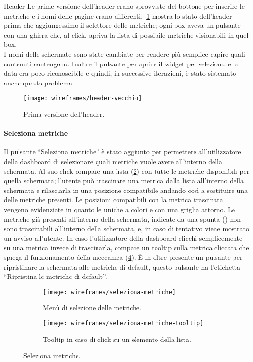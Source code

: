 \begin{bclogo}{Header}
Le prime versione dell'header erano sprovviste del bottone per inserire le metriche e i nomi delle pagine erano differenti.~\ref{fig:header-vecchio} mostra lo stato dell'header prima che aggiungessimo il selettore delle metriche; ogni box aveva un pulsante con una ghiera che, al click, apriva la lista di possibile metriche visionabili in quel box.\\
I nomi delle schermate sono state cambiate per rendere più semplice capire quali contenuti contengono.
Inoltre il pulsante per aprire il widget per selezionare la data era poco riconoscibile e quindi, in successive iterazioni, è stato sistemato anche questo problema.
\begin{figure}[H]
    \centering
    \texttt{[image: wireframes/header-vecchio]}
    \caption{Prima versione dell'header.}\label{fig:header-vecchio}
\end{figure}
\end{bclogo}

\paragraph{Seleziona metriche}
Il pulsante ``Seleziona metriche'' è stato aggiunto per permettere all'utilizzatore della dashboard di selezionare quali metriche vuole avere all'interno della schermata. Al suo click compare una lista (\ref{fig:seleziona-metriche}) con tutte le metriche disponibili per quella schermata; l'utente può trascinare una metrica dalla lista all'interno della schermata e rilasciarla in una posizione compatibile andando così a sostituire una delle metriche presenti. Le posizioni compatibili con la metrica trascinata vengono evidenziate in quanto le uniche a colori e con una griglia attorno. Le metriche già presenti all'interno della schermata, indicate da una spunta (\checkmark) non sono trascinabili all'interno della schermata, e, in caso di tentativo viene mostrato un avviso all'utente. In caso l'utilizzatore della dashboard clicchi semplicemente su una metrica invece di trascinarla, compare un tooltip sulla metrica cliccata che spiega il funzionamento della meccanica (\ref{fig:seleziona-metriche-tooltip}). \`E in oltre presente un pulsante per ripristinare la schermata alle metriche di default, questo pulsante ha l'etichetta ``Ripristina le metriche di default''.

\begin{figure}[H]
    \begin{subfigure}[b]{0.5\textwidth}
        \centering
        \texttt{[image: wireframes/seleziona-metriche]}
        \caption{Menù di selezione delle metriche.}\label{fig:seleziona-metriche}
    \end{subfigure}
\hfill
    \begin{subfigure}[b]{0.5\textwidth}
        \centering
        \texttt{[image: wireframes/seleziona-metriche-tooltip]}
        \caption{Tooltip in caso di click su un elemento della lista.}\label{fig:seleziona-metriche-tooltip}
    \end{subfigure}
    \caption{Seleziona metriche.}
\end{figure}



